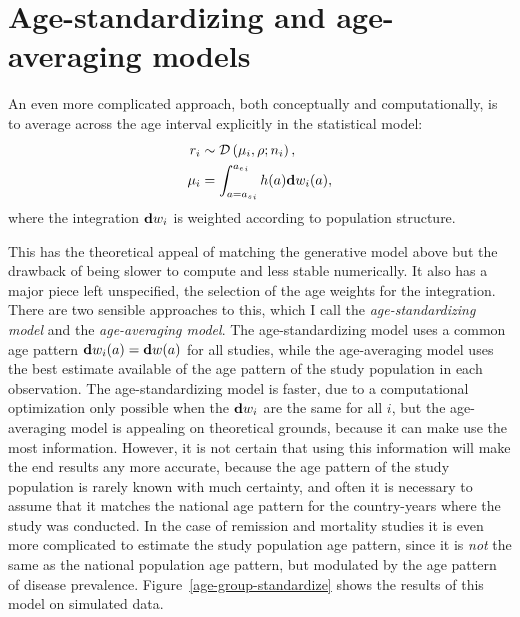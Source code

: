 \section{Age-standardizing and age-averaging models}
An even more complicated approach, both conceptually and
computationally, is to average across the age interval explicitly in
the statistical model:
\begin{align*}
r_i &\sim \mathcal{D}\left(\mu_i, \rho; n_i\right),\\
\mu_i &= \int_{a={a_s}_i}^{{a_e}_i} h(a)\mathbf{d} w_i(a),
\end{align*}
where the integration $\mathbf{d} w_i$ is weighted according to population
structure.

This has the theoretical appeal of matching the generative model above
but the drawback of being slower to compute and less stable
numerically.  It also has a major piece left unspecified, the
selection of the age weights for the integration.  There are two
sensible approaches to this, which I call the \emph{age-standardizing
  model} and the \emph{age-averaging model}.  The age-standardizing
model uses a common age pattern $\mathbf{d} w_i(a) = \mathbf{d} w(a)$ for all studies, while
the age-averaging model uses the best estimate available of the age
pattern of the study population in each observation.  The
age-standardizing model is faster, due to a computational optimization
only possible when the $\mathbf{d} w_i$ are the same for all $i$, but the
age-averaging model is appealing on theoretical grounds, because it
can make use the most information.  However, it is not certain that
using this information will make the end results any more accurate,
because the age pattern of the study population is rarely known with
much certainty, and often it is necessary to assume that it matches
the national age pattern for the country-years where the study was
conducted.  In the case of remission and mortality studies it is even
more complicated to estimate the study population age pattern, since
it is \emph{not} the same as the national population age pattern, but
modulated by the age pattern of disease prevalence.
Figure~\ref{age-group-standardize} shows the results of this model on
simulated data.

